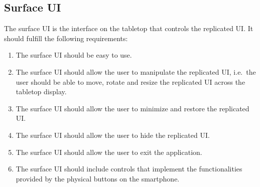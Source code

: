 
\subsection{Surface UI}

The surface UI is the interface on the tabletop that controls the replicated UI.
It should fulfill the following requirements:

\label{RD}
\begin{enumerate}[{RD}-1]
\item The surface UI should be easy to use.
\item The surface UI should allow the user to manipulate the replicated UI, i.e.\ the user should be able to move, rotate and resize the replicated UI across the tabletop display.
\item The surface UI should allow the user to minimize and restore the replicated UI.
\item The surface UI should allow the user to hide the replicated UI.
\item The surface UI should allow the user to exit the application.
\item The surface UI should include controls that implement the functionalities provided by the physical buttons on the smartphone.
\end{enumerate}


%
%
%

